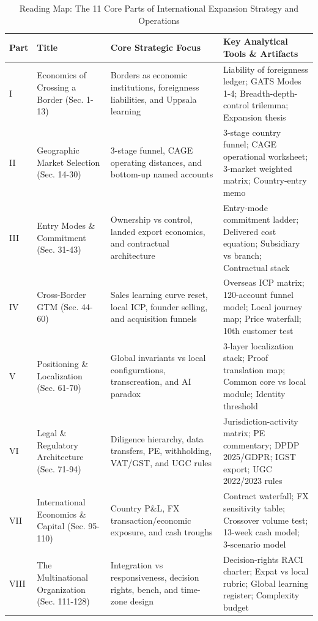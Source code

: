 \begin{table}[t]
\centering
\small
\caption{Reading Map: The 11 Core Parts of International Expansion Strategy and Operations}
\label{tab:ch31_reading_map}
\begin{tabularx}{\textwidth}{p{1.8cm} p{2.8cm} p{4.4cm} X}
\toprule
\textbf{Part} & \textbf{Title} & \textbf{Core Strategic Focus} & \textbf{Key Analytical Tools \& Artifacts} \\
\midrule
I & Economics of Crossing a Border (Sec. 1-13) & Borders as economic institutions, foreignness liabilities, and Uppsala learning & Liability of foreignness ledger; GATS Modes 1-4; Breadth-depth-control trilemma; Expansion thesis \\
II & Geographic Market Selection (Sec. 14-30) & 3-stage funnel, CAGE operating distances, and bottom-up named accounts & 3-stage country funnel; CAGE operational worksheet; 3-market weighted matrix; Country-entry memo \\
III & Entry Modes \& Commitment (Sec. 31-43) & Ownership vs control, landed export economics, and contractual architecture & Entry-mode commitment ladder; Delivered cost equation; Subsidiary vs branch; Contractual stack \\
IV & Cross-Border GTM (Sec. 44-60) & Sales learning curve reset, local ICP, founder selling, and acquisition funnels & Overseas ICP matrix; 120-account funnel model; Local journey map; Price waterfall; 10th customer test \\
V & Positioning \& Localization (Sec. 61-70) & Global invariants vs local configurations, transcreation, and AI paradox & 3-layer localization stack; Proof translation map; Common core vs local module; Identity threshold \\
VI & Legal \& Regulatory Architecture (Sec. 71-94) & Diligence hierarchy, data transfers, PE, withholding, VAT/GST, and UGC rules & Jurisdiction-activity matrix; PE commentary; DPDP 2025/GDPR; IGST export; UGC 2022/2023 rules \\
VII & International Economics \& Capital (Sec. 95-110) & Country P\&L, FX transaction/economic exposure, and cash troughs & Contract waterfall; FX sensitivity table; Crossover volume test; 13-week cash model; 3-scenario model \\
VIII & The Multinational Organization (Sec. 111-128) & Integration vs responsiveness, decision rights, bench, and time-zone design & Decision-rights RACI charter; Expat vs local rubric; Global learning register; Complexity budget \\

\end{tabularx}
\end{table}

